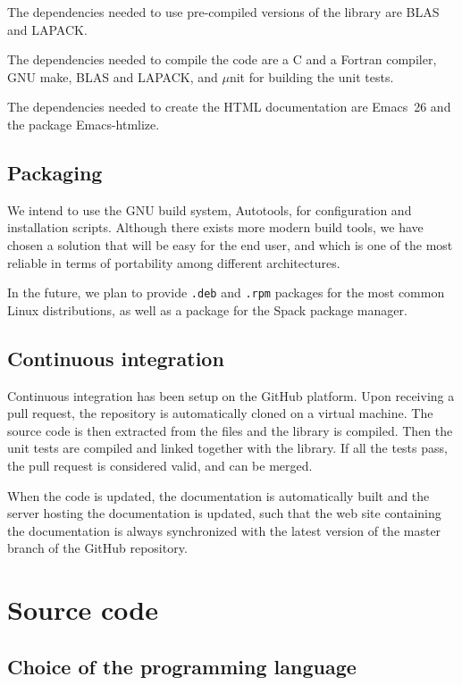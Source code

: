 The dependencies needed to use pre-compiled versions of the library
are \ac{BLAS} and \ac{LAPACK}.

The dependencies needed to compile the code are
a C and a Fortran compiler, GNU make, \ac{BLAS} and \ac{LAPACK}, and
$\mu$nit\cite{munit} for building the unit tests.

The dependencies needed to create the \ac{HTML} documentation are
Emacs~26 and the package Emacs-htmlize.

\subsection{Packaging}

We intend to use the GNU build system, Autotools,\cite{autotools} for
configuration and installation scripts.
Although there exists more modern build tools, we have chosen a
solution that will be easy for the end user, and which is one of the
most reliable in terms of portability among different architectures.

In the future, we plan to provide \texttt{.deb} and \texttt{.rpm}
packages for the most common Linux distributions, as well as a package
for the Spack package manager\cite{spack}.


\subsection{Continuous integration}

Continuous integration has been setup on the GitHub platform. Upon
receiving a pull request, the repository is automatically cloned on a virtual machine. The source code is then extracted from the {\orgmode}
files and the library is compiled. Then the unit tests are compiled
and linked together with the library. If all the tests pass, the
pull request is considered valid, and can be merged.

When the code is updated, the documentation is automatically built and
the server hosting the documentation is updated, such that the web
site containing the documentation is always synchronized with the
latest version of the master branch of the GitHub repository.


\section{Source code}

\subsection{Choice of the programming language}

